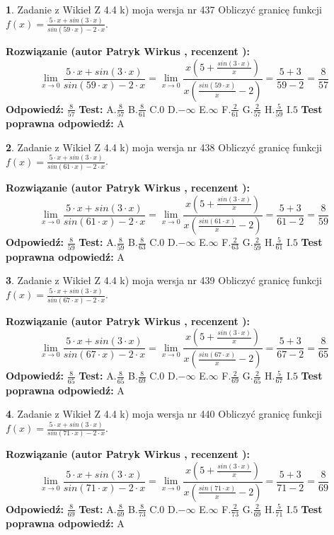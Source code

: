 \documentclass[12pt, a4paper]{article}
\theoremstyle{definition} %
\newtheorem{zad}{}
\newcommand{\zadStart}[1]{\begin{zad}#1\newline}
\newcommand{\zadStop}{\end{zad}}
\newcommand{\rozwStart}[2]{\noindent \textbf{Rozwiązanie (autor #1 , recenzent #2): }\newline}
\newcommand{\rozwStop}{\newline}
\newcommand{\odpStart}{\noindent \textbf{Odpowiedź:}\newline}
\newcommand{\odpStop}{\newline}
\newcommand{\testStart}{\noindent \textbf{Test:}\newline}
\newcommand{\testStop}{\newline}
\newcommand{\kluczStart}{\noindent \textbf{Test poprawna odpowiedź:}\newline}
\newcommand{\kluczStop}{\newline}
\begin{document}
\zadStart{Zadanie z Wikieł Z 4.4 k) moja wersja nr 437}
Obliczyć granicę funkcji $f(x)=\frac{5\cdot x +sin(3\cdot x)}{sin(59\cdot x) -2\cdot x}$.
\zadStop
\rozwStart{Patryk Wirkus}{}
$$\lim\limits_{x\to 0}\frac{5\cdot x +sin(3\cdot x)}{sin(59\cdot x) -2\cdot x}
=\lim\limits_{x\to 0}\frac{x(5+\frac{sin(3\cdot x)}{x})}{x(\frac{sin(59\cdot x)}{x}-2)}
=\frac{5+3}{59-2} = \frac{8}{57}$$
\rozwStop
\odpStart
$\frac{8}{57}$
\odpStop
\testStart
A.$\frac{8}{57}$
B.$\frac{8}{61}$
C.$0$
D.$-\infty$
E.$\infty$
F.$\frac{2}{61}$
G.$\frac{2}{57}$
H.$\frac{5}{59}$
I.$5$
\testStop
\kluczStart
A
\kluczStop



\zadStart{Zadanie z Wikieł Z 4.4 k) moja wersja nr 438}
Obliczyć granicę funkcji $f(x)=\frac{5\cdot x +sin(3\cdot x)}{sin(61\cdot x) -2\cdot x}$.
\zadStop
\rozwStart{Patryk Wirkus}{}
$$\lim\limits_{x\to 0}\frac{5\cdot x +sin(3\cdot x)}{sin(61\cdot x) -2\cdot x}
=\lim\limits_{x\to 0}\frac{x(5+\frac{sin(3\cdot x)}{x})}{x(\frac{sin(61\cdot x)}{x}-2)}
=\frac{5+3}{61-2} = \frac{8}{59}$$
\rozwStop
\odpStart
$\frac{8}{59}$
\odpStop
\testStart
A.$\frac{8}{59}$
B.$\frac{8}{63}$
C.$0$
D.$-\infty$
E.$\infty$
F.$\frac{2}{63}$
G.$\frac{2}{59}$
H.$\frac{5}{61}$
I.$5$
\testStop
\kluczStart
A
\kluczStop



\zadStart{Zadanie z Wikieł Z 4.4 k) moja wersja nr 439}
Obliczyć granicę funkcji $f(x)=\frac{5\cdot x +sin(3\cdot x)}{sin(67\cdot x) -2\cdot x}$.
\zadStop
\rozwStart{Patryk Wirkus}{}
$$\lim\limits_{x\to 0}\frac{5\cdot x +sin(3\cdot x)}{sin(67\cdot x) -2\cdot x}
=\lim\limits_{x\to 0}\frac{x(5+\frac{sin(3\cdot x)}{x})}{x(\frac{sin(67\cdot x)}{x}-2)}
=\frac{5+3}{67-2} = \frac{8}{65}$$
\rozwStop
\odpStart
$\frac{8}{65}$
\odpStop
\testStart
A.$\frac{8}{65}$
B.$\frac{8}{69}$
C.$0$
D.$-\infty$
E.$\infty$
F.$\frac{2}{69}$
G.$\frac{2}{65}$
H.$\frac{5}{67}$
I.$5$
\testStop
\kluczStart
A
\kluczStop



\zadStart{Zadanie z Wikieł Z 4.4 k) moja wersja nr 440}
Obliczyć granicę funkcji $f(x)=\frac{5\cdot x +sin(3\cdot x)}{sin(71\cdot x) -2\cdot x}$.
\zadStop
\rozwStart{Patryk Wirkus}{}
$$\lim\limits_{x\to 0}\frac{5\cdot x +sin(3\cdot x)}{sin(71\cdot x) -2\cdot x}
=\lim\limits_{x\to 0}\frac{x(5+\frac{sin(3\cdot x)}{x})}{x(\frac{sin(71\cdot x)}{x}-2)}
=\frac{5+3}{71-2} = \frac{8}{69}$$
\rozwStop
\odpStart
$\frac{8}{69}$
\odpStop
\testStart
A.$\frac{8}{69}$
B.$\frac{8}{73}$
C.$0$
D.$-\infty$
E.$\infty$
F.$\frac{2}{73}$
G.$\frac{2}{69}$
H.$\frac{5}{71}$
I.$5$
\testStop
\kluczStart
A
\kluczStop
\end{document}
